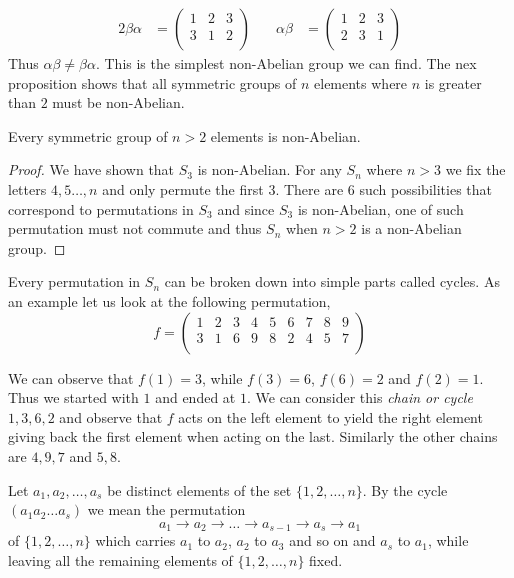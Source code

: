 \begin{alignat*}{2}
\beta\alpha &=
 \begin{pmatrix}
  1 & 2 & 3 \\
  3 & 1 & 2 \\
 \end{pmatrix}
 & \quad \alpha\beta &=  
 \begin{pmatrix}
  1 & 2 & 3 \\
  2 & 3 & 1 \\
 \end{pmatrix}
\end{alignat*}
Thus $\alpha\beta \neq \beta\alpha$. This is the simplest non-Abelian group we can find. The nex proposition
shows that all symmetric groups of $n$ elements where $n$ is greater than $2$ must be non-Abelian.
\begin{Proposition}\label{prop:non_abelia_sn}
    Every symmetric group of $n > 2$ elements is non-Abelian.
\end{Proposition}
\begin{proof}
    We have shown that $S_3$ is non-Abelian. For any $S_n$ where $n > 3$ we fix the letters $4,5\ldots,n$ and
    only permute the first $3$. There are $6$ such possibilities that correspond to permutations in $S_3$ and
    since $S_3$ is non-Abelian, one of such permutation must not commute and thus $S_n$ when $n > 2$ is a
    non-Abelian group.
\end{proof}


Every permutation in $S_n$ can be broken down into simple parts called cycles. As
an example let us look at the following permutation,
\begin{equation*}
    f =
 \begin{pmatrix}
  1 & 2 & 3 & 4 & 5 & 6 & 7 & 8 & 9 \\
  3 & 1 & 6 & 9 & 8 & 2 & 4 & 5 & 7 \\
 \end{pmatrix}
\end{equation*}

We can observe that $f(1) = 3$, while $f(3) = 6$, $f(6) = 2$ and $f(2) = 1$. Thus we started with
$1$ and ended at $1$. We can consider this \emph{chain or cycle} $1,3,6,2$ and observe 
that $f$ acts on the left element to yield the right element giving back the first element when
acting on the last. Similarly the other chains are $4,9,7$
and $5,8$.

\begin{Definition}
    Let $a_1,a_2,\ldots,a_s$ be distinct elements of the set $\lbrace 1,2,\ldots,n\rbrace$. By the
    cycle $\left(a_1 a_2 \ldots a_s\right)$ we mean the permutation
    \begin{equation*}
	a_1 \rightarrow a_2 \rightarrow \ldots \rightarrow a_{s-1} \rightarrow a_{s} \rightarrow
	a_{1}
    \end{equation*}
    of $\lbrace 1,2,\ldots,n\rbrace$ which carries $a_1$ to $a_2$, $a_2$ to $a_3$ and so on and
    $a_s$ to $a_1$, while leaving all the remaining elements of $\lbrace 1,2,\ldots,n\rbrace$ fixed.
\end{Definition}

